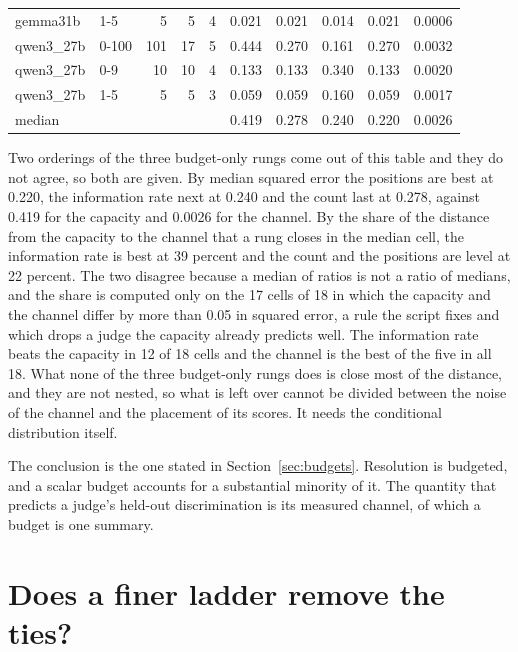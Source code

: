 \documentclass{article}
\theoremstyle{definition}
\theoremstyle{remark}
\begin{document}
\begin{table}[h]
\begin{tabular}{llrrrrrrrr}
gemma31b & 1-5 & 5 & 5 & 4 & 0.021 & 0.021 & 0.014 & 0.021 & 0.0006 \\
qwen3\_27b & 0-100 & 101 & 17 & 5 & 0.444 & 0.270 & 0.161 & 0.270 & 0.0032 \\
qwen3\_27b & 0-9 & 10 & 10 & 4 & 0.133 & 0.133 & 0.340 & 0.133 & 0.0020 \\
qwen3\_27b & 1-5 & 5 & 5 & 3 & 0.059 & 0.059 & 0.160 & 0.059 & 0.0017 \\
\midrule
median & & & & & 0.419 & 0.278 & 0.240 & 0.220 & 0.0026 \\
\bottomrule
\end{tabular}
\end{table}

Two orderings of the three budget-only rungs come out of this table and they do not agree, so both
are given. By median squared error the positions are best at 0.220, the information rate next at
0.240 and the count last at 0.278, against 0.419 for the capacity and 0.0026 for the channel. By the
share of the distance from the capacity to the channel that a rung closes in the median cell, the
information rate is best at 39 percent and the count and the positions are level at 22 percent. The
two disagree because a median of ratios is not a ratio of medians, and the share is computed only on
the 17 cells of 18 in which the capacity and the channel differ by more than 0.05 in squared error,
a rule the script fixes and which drops a judge the capacity already predicts well. The information
rate beats the capacity in 12 of 18 cells and the channel is the best of the five in all 18. What
none of the three budget-only rungs does is close most of the distance, and they are not nested, so
what is left over cannot be divided between the noise of the channel and the placement of its
scores. It needs the conditional distribution itself.

The conclusion is the one stated in Section~\ref{sec:budgets}. Resolution is budgeted, and a scalar
budget accounts for a substantial minority of it. The quantity that predicts a judge's held-out
discrimination is its measured channel, of which a budget is one summary.

\section{Does a finer ladder remove the ties?}
\label{app:longsheet}
\end{document}
